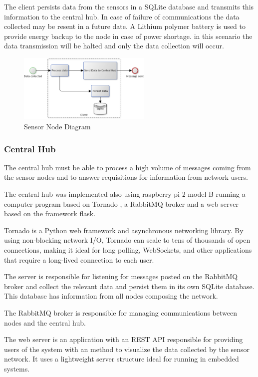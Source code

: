 \documentclass[letterpaper]{IEEEtran}
\begin{document}
The client persists data from the sensors in a SQLite\cite{Sqlite2015} database and transmits this information to the central hub. In case of failure of communications the data collected may be resent in a future date.
A Lithium polymer battery is used to provide energy backup to the node in case of power shortage. in this scenario the data transmission will be halted and only the data collection will occur.
\begin{figure}[ht!]
\centering
\includegraphics[width=2.5in]{client_diagram}
\caption{Sensor Node Diagram}
\label{sensor_diagram}
\end{figure}


\subsubsection{Central Hub}
The central hub must be able to process a high volume of messages coming from the sensor nodes and to answer requisitions for information from network users.

The central hub was implemented also using raspberry pi 2 model B running a computer program based on Tornado \cite{Tornado2015}, a RabbitMQ broker and  a web server based on the framework flask\cite{Flask}.

Tornado is a Python web framework and asynchronous networking library. By using non-blocking network I/O, Tornado can scale to tens of thousands of open connections, making it ideal for long polling, WebSockets, and other applications that require a long-lived connection to each user.\cite{Tornado2015}

The server is responsible for listening for messages posted on the RabbitMQ broker and collect the relevant data and persist them in its own SQLite  database. This database has information from all nodes composing the network.

The RabbitMQ broker is responsible for managing communications between nodes and the central hub.

The web server is an application with an REST API\cite{Fielding2000} responsible for providing users of the system with an method to visualize the data collected by the sensor network. It uses a lightweight server structure ideal for running in embedded systems.
\end{document}

